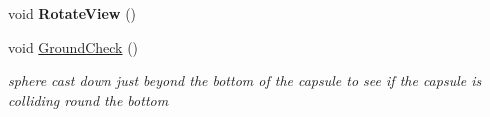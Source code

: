 \begin{DoxyCompactItemize}
void {\bfseries Rotate\+View} ()
\item 
\mbox{\label{class_unity_standard_assets_1_1_characters_1_1_first_person_1_1_rigidbody_first_person_controller_aefe47a27895ea08e670f4bd608678e2e}} 
void \hyperlink{class_unity_standard_assets_1_1_characters_1_1_first_person_1_1_rigidbody_first_person_controller_aefe47a27895ea08e670f4bd608678e2e}{Ground\+Check} ()
\begin{DoxyCompactList}\small\item\em sphere cast down just beyond the bottom of the capsule to see if the capsule is colliding round the bottom \end{DoxyCompactList}\end{DoxyCompactItemize}
